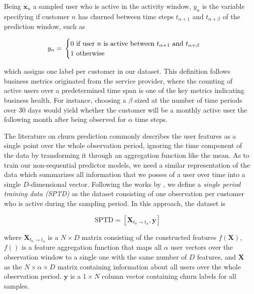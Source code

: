 \documentclass{kththesis}
\begin{document}
Being $\mathbf{x}_n$ a sampled user who is active in the activity window, $y_{n}$ is the variable specifying if customer $n$ has churned between time steps $t_{\alpha+1}$ and $t_{\alpha+\beta}$ of the prediction window, such as

\begin{equation}
y_n = \\ 
\begin{cases}
  \text{0 if user $n$ is active between $t_{\alpha+1}$ and $t_{\alpha+\beta}$} \\    
  \text{1 otherwise}    
\end{cases}
\end{equation}

which assigns one label per customer in our dataset. This definition follows business metrics originated from the service provider, where the counting of active users over a predetermined time span is one of the key metrics indicating business health. For instance, choosing a $\beta$ sized at the number of time periods over 30 days would yield whether the customer will be a monthly active user the following month after being observed for $\alpha$ time steps. 

The literature on churn prediction commonly describes the user features as a single point over the whole observation period, ignoring the time component of the data by transforming it through an aggregation function like the mean. As to train our non-sequential predictor models, we need a similar representation of the data which summarizes all information that we posses of a user over time into a single $D$-dimensional vector. Following the works by \citep{GurAli2014}, we define a \emph{single period training data (SPTD)} as the dataset consisting of one observation per customer who is active during the sampling period. In this approach, the dataset is 

\begin{equation}
\text{SPTD} = [\mathbf{X}_{t_0 \rightarrow t_\alpha}, \mathbf{y}]
\end{equation}

where $\mathbf{X}_{t_0\rightarrow t_\alpha}$ is a $N \times D$ matrix consisting of the constructed features $f(\mathbf{X})$, $f()$ is a feature aggregation function that maps all $\alpha$ user vectors over the observation window to a single one with the same number of $D$ features, and  $\mathbf{X}$ as the $N \times \alpha \times D$ matrix containing information about all users over the whole observation period. $\mathbf{y}$ is a $1 \times N$ column vector containing churn labels for all samples. 
\end{document}
